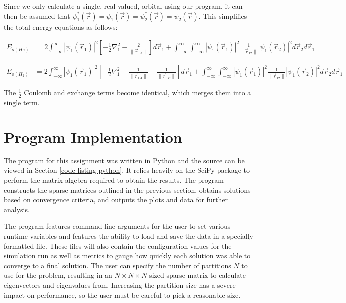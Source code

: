 \documentclass[10pt, oneside, letterpaper]{article}
\begin{document}
Since we only calculate a single, real-valued, orbital using our program, it can then be assumed that $\psi_1^\ast(\vec{r}) = \psi_1(\vec{r}) = \psi_2^\ast(\vec{r}) = \psi_2(\vec{r})$. This simplifies the total energy equations as follows:

\begin{align*}
  E_{o(He)} &= 2\int_{-\infty}^{\infty} \left|\psi_1(\vec{r}_1)\right|^2 \left[ -\frac{1}{2}\nabla_1^2 - \frac{2}{\|\vec{r}_{1 A}\|} \right] d\vec{r}_1 + 
   \int_{-\infty}^{\infty}\int_{-\infty}^{\infty} \left|\psi_1(\vec{r}_1)\right|^2 \frac{1}{\|\vec{r}_{12}\|} \left|\psi_1(\vec{r}_2)\right|^2 d\vec{r}_2d\vec{r}_1
\end{align*}

\begin{align*}
  E_{o(H_2)} &= 2\int_{-\infty}^{\infty} \left|\psi_1(\vec{r}_1)\right|^2 \left[ -\frac{1}{2}\nabla_1^2 - \frac{1}{\|\vec{r}_{1 A}\|} - \frac{1}{\|\vec{r}_{1 B}\|} \right] d\vec{r}_1 +
   \int_{-\infty}^{\infty}\int_{-\infty}^{\infty} \left|\psi_1(\vec{r}_1)\right|^2 \frac{1}{\|\vec{r}_{12}\|} \left|\psi_1(\vec{r}_2)\right|^2 d\vec{r}_2d\vec{r}_1
\end{align*}

The $\frac{1}{2}$ Coulomb and exchange terms become identical, which merges them into a single term.

\newpage
\section{Program Implementation}

The program for this assignment was written in Python and the source can be viewed in Section \ref{code-listing-python}. It relies heavily on the SciPy package to perform the matrix algebra required to obtain the results. The program constructs the sparse matrices outlined in the previous section, obtains solutions based on convergence criteria, and outputs the plots and data for further analysis.

The program features command line arguments for the user to set various runtime variables and features the ability to load and save the data in a specially formatted file. These files will also contain the configuration values for the simulation run as well as metrics to gauge how quickly each solution was able to converge to a final solution. The user can specify the number of partitions $N$ to use for the problem, resulting in an $N \times N \times N$ sized sparse matrix to calculate eigenvectors and eigenvalues from. Increasing the partition size has a severe impact on performance, so the user must be careful to pick a reasonable size.
\end{document}
